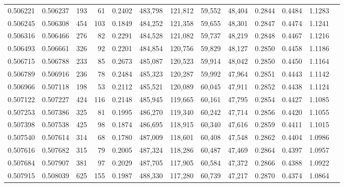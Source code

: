 \begin{tabular}{rrrrrrrrrrrrr}
0.506221 & 0.506237 &   193 &    61 &                                     0.2402 & 483,798 & 121,812 &  59,552 &  48,404 & 0.2844 & 0.4484 & 1.1283 \\
0.506245 & 0.506308 &   454 &   103 &                                     0.1849 & 484,252 & 121,358 &  59,655 &  48,301 & 0.2847 & 0.4474 & 1.1241 \\
0.506316 & 0.506466 &   276 &    82 &                                     0.2291 & 484,528 & 121,082 &  59,737 &  48,219 & 0.2848 & 0.4467 & 1.1216 \\
0.506493 & 0.506661 &   326 &    92 &                                     0.2201 & 484,854 & 120,756 &  59,829 &  48,127 & 0.2850 & 0.4458 & 1.1186 \\
0.506715 & 0.506788 &   233 &    85 &                                     0.2673 & 485,087 & 120,523 &  59,914 &  48,042 & 0.2850 & 0.4450 & 1.1164 \\
0.506789 & 0.506916 &   236 &    78 &                                     0.2484 & 485,323 & 120,287 &  59,992 &  47,964 & 0.2851 & 0.4443 & 1.1142 \\
0.506966 & 0.507118 &   198 &    53 &                                     0.2112 & 485,521 & 120,089 &  60,045 &  47,911 & 0.2852 & 0.4438 & 1.1124 \\
0.507122 & 0.507227 &   424 &   116 &                                     0.2148 & 485,945 & 119,665 &  60,161 &  47,795 & 0.2854 & 0.4427 & 1.1085 \\
0.507253 & 0.507386 &   325 &    81 &                                     0.1995 & 486,270 & 119,340 &  60,242 &  47,714 & 0.2856 & 0.4420 & 1.1055 \\
0.507398 & 0.507538 &   425 &    98 &                                     0.1874 & 486,695 & 118,915 &  60,340 &  47,616 & 0.2859 & 0.4411 & 1.1015 \\
0.507540 & 0.507614 &   314 &    68 &                                     0.1780 & 487,009 & 118,601 &  60,408 &  47,548 & 0.2862 & 0.4404 & 1.0986 \\
0.507616 & 0.507682 &   315 &    79 &                                     0.2005 & 487,324 & 118,286 &  60,487 &  47,469 & 0.2864 & 0.4397 & 1.0957 \\
0.507684 & 0.507907 &   381 &    97 &                                     0.2029 & 487,705 & 117,905 &  60,584 &  47,372 & 0.2866 & 0.4388 & 1.0922 \\
0.507915 & 0.508039 &   625 &   155 &                                     0.1987 & 488,330 & 117,280 &  60,739 &  47,217 & 0.2870 & 0.4374 & 1.0864 \\

\end{tabular}

